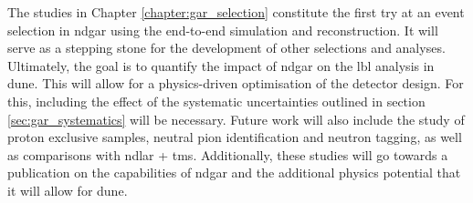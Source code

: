 \begin{comment}
Finally, in Chapter \ref{chapter:gar_selection} I apply to the event selection in \gls{ndgar}. I start by describing a method for selecting $\nu_{\mu}$ \gls{cc} events in section \ref{sec:gar_numu_cc}. This is mainly based on the muon score derived from the muon/pion classification I developed. Additionally, I perform an optimisation of the FV. As part of this study, I also examined the kinematics of the selected primary muon and the reconstructed interaction vertex. Next, in section \ref{sec:gar_charged_pions} I explore the capabilities of \gls{ndgar} and its reconstruction at identifying charged pions. I optimise a selection based on the reconstructed charged pion multiplicity, for events with 0, 1, 2, and $\geq 3 \pi^{\pm}$ in the final state. I the performance of the selection as a function of the truth hadronic invariant mass, as well as the true pion kinematics for the $\nu_{\mu}$ \gls{cc} $1\pi^{\pm}$ case. I briefly discuss the possibility of tagging events with neutral pions by reconstructing the invariant mass of the photon pairs from their decay in section \ref{sec:gar_neutral_pions}. Lastly, in section \ref{sec:gar_energy} I study the neutrino energy reconstruction of the selected $\nu_{\mu}$ \gls{cc} events using a calorimetric approach. For this, I compare the values obtained using generator-level and reconstructed information.

These studies constitute the first try at an event selection in \gls{ndgar} using full simulation and reconstruction. It will serve as a stepping stone for the development of other selections and analyses. Ultimately, the goal is to quantify the impact of \gls{ndgar} on the \gls{lbl} analysis in \gls{dune}. For this, including the effect of the systematic uncertainties outlined in section \ref{sec:gar_systematics} will be necessary.
\end{comment}

The studies in Chapter \ref{chapter:gar_selection} constitute the first try at an event selection in \gls{ndgar} using the end-to-end simulation and reconstruction. It will serve as a stepping stone for the development of other selections and analyses. Ultimately, the goal is to quantify the impact of \gls{ndgar} on the \gls{lbl} analysis in \gls{dune}. This will allow for a physics-driven optimisation of the detector design. For this, including the effect of the systematic uncertainties outlined in section \ref{sec:gar_systematics} will be necessary. Future work will also include the study of proton exclusive samples, neutral pion identification and neutron tagging, as well as comparisons with \gls{ndlar} + \gls{tms}. Additionally, these studies will go towards a publication on the capabilities of \gls{ndgar} and the additional physics potential that it will allow for \gls{dune}.

